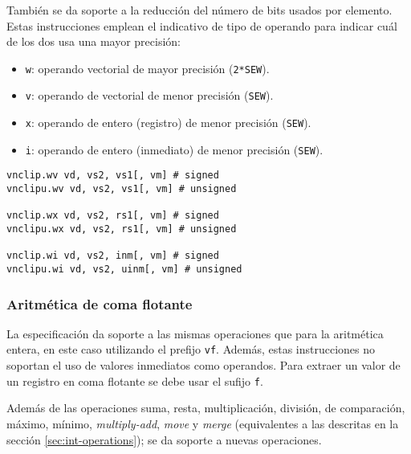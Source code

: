 También se da soporte a la reducción del número de bits usados por elemento.
Estas instrucciones emplean el indicativo de tipo de operando para indicar cuál
de los dos usa una mayor precisión:
\begin{itemize}
\item \texttt{w}: operando vectorial de mayor precisión (\texttt{2*SEW}).
\item \texttt{v}: operando de vectorial de menor precisión (\texttt{SEW}).
\item \texttt{x}: operando de entero (registro) de menor precisión (\texttt{SEW}).
\item \texttt{i}: operando de entero (inmediato) de menor precisión (\texttt{SEW}).
\end{itemize}

\begin{lstlisting}
vnclip.wv vd, vs2, vs1[, vm] # signed
vnclipu.wv vd, vs2, vs1[, vm] # unsigned

vnclip.wx vd, vs2, rs1[, vm] # signed
vnclipu.wx vd, vs2, rs1[, vm] # unsigned

vnclip.wi vd, vs2, inm[, vm] # signed
vnclipu.wi vd, vs2, uinm[, vm] # unsigned
\end{lstlisting}

\subsubsection{Aritmética de coma flotante}
La especificación da soporte a las mismas operaciones que para la aritmética
entera, en este caso utilizando el prefijo \texttt{vf}. Además, estas
instrucciones no soportan el uso de valores inmediatos como operandos. Para
extraer un valor de un registro en coma flotante se debe usar el sufijo
\texttt{f}.

Además de las operaciones suma, resta, multiplicación, división, de
comparación, máximo, mínimo, \textit{multiply-add}, \textit{move} y
\textit{merge} (equivalentes a las descritas en la sección
\ref{sec:int-operations}); se da soporte a nuevas operaciones.

